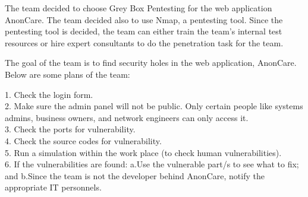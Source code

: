 \documentclass[11pt]{report}
\begin{document}
\begin{flushleft}
	
The team decided to choose \textit{}Grey Box Pentesting for the web application AnonCare. The team decided also to use \textit{}Nmap, a pentesting tool. Since the pentesting tool is decided, the team can either train the team’s internal test resources or hire expert consultants to do the penetration task for the team.\\

\end{flushleft}

\begin{flushleft}
	
The goal of the team is to find security holes in the web application, AnonCare. Below are some plans of the team:\

\end{flushleft}


\begin{flushleft}
	
1. Check the login form.\\
2. Make sure the admin panel will not be public. Only certain people like systems admins, business
owners, and network engineers can only access it.\\
3. Check the ports for vulnerability.\\
4. Check the source codes for vulnerability.\\
5. Run a simulation within the work place (to check human vulnerabilities).\\
6. If the vulnerabilities are found: a.Use the vulnerable part/s to see what to fix; and b.Since the team is not the developer behind AnonCare, notify the appropriate IT personnels.

\end{flushleft}
\end{document}
